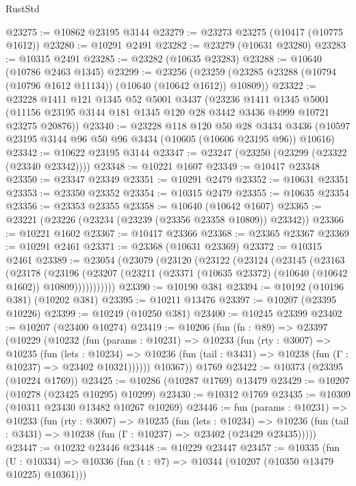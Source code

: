 \begin{lexlean}{RustStd}
\begin{coremodule}
@23275 := @10862 @23195 @3144
@23279 := @23273 @23275 (@10417 (@10775 @1612))
@23280 := @10291 @2491
@23282 := @23279 (@10631 @23280)
@23283 := @10315 @2491
@23285 := @23282 (@10635 @23283)
@23288 := @10640 (@10786 @2463 @1345)
@23299 := @23256
    (@23259 (@23285 @23288 (@10794 (@10796 @1612 @11134)) (@10640 (@10642 @1612)) @10809))
@23322 := @23228
    @1411
    @121
    @1345
    @52
    @5001
    @3437
    (@23236
      @1411
      @1345
      @5001
      (@11156 @23195 @3144 @181 @1345 @120 @28 @3442 @3436 @4999 @10721 @23275 @20876))
@23340 := @23228
    @118
    @120
    @50
    @28
    @3434
    @3436
    (@10597 @23195 @3144 @96 @50 @96 @3434 (@10605 (@10606 @23195 @96)) @10616)
@23342 := @10622 @23195 @3144
@23347 := @23247 (@23250 (@23299 (@23322 (@23340 @23342))))
@23348 := @10221 @1607
@23349 := @10417 @23348
@23350 := @23347 @23349
@23351 := @10291 @2479
@23352 := @10631 @23351
@23353 := @23350 @23352
@23354 := @10315 @2479
@23355 := @10635 @23354
@23356 := @23353 @23355
@23358 := @10640 (@10642 @1607)
@23365 := @23221 (@23226 (@23234 (@23239 (@23356 @23358 @10809)) @23342))
@23366 := @10221 @1602
@23367 := @10417 @23366
@23368 := @23365 @23367
@23369 := @10291 @2461
@23371 := @23368 (@10631 @23369)
@23372 := @10315 @2461
@23389 := @23054
    (@23079
      (@23120
        (@23122
          (@23124
            (@23145
              (@23163
                (@23178
                  (@23196
                    (@23207
                      (@23211 (@23371 (@10635 @23372) (@10640 (@10642 @1602)) @10809)))))))))))
@23390 := @10190 @381
@23394 := @10192 (@10196 @381) (@10202 @381)
@23395 := @10211 @13476
@23397 := @10207 (@23395 @10226)
@23399 := @10249 (@10250 @381)
@23400 := @10245 @23399
@23402 := @10207 (@23400 @10274)
@23419 := @10206
    (fun (fn : @89) =>
    @23397
      (@10229
        (@10232
          (fun (params : @10231) =>
          @10233
            (fun (rty : @3007) =>
            @10235
              (fun (lets : @10234) =>
              @10236 (fun (tail : @3431) => @10238 (fun (Γ : @10237) => @23402 @10321))))))
        @10367))
    @1769
@23422 := @10373 (@23395 (@10224 @1769))
@23425 := @10286 (@10287 @1769) @13479
@23429 := @10207 (@10278 (@23425 @10295) @10299)
@23430 := @10312 @1769
@23435 := @10309 (@10311 @23430 @13482 @10267 @10269)
@23446 := fun (params : @10231) =>
  @10233
    (fun (rty : @3007) =>
    @10235
      (fun (lets : @10234) =>
      @10236 (fun (tail : @3431) => @10238 (fun (Γ : @10237) => @23402 (@23429 @23435)))))
@23447 := @10232 @23446
@23448 := @10229 @23447
@23457 := @10335
    (fun (U : @10334) => @10336 (fun (t : @7) => @10344 (@10207 (@10350 @13479 @10225) @10361)))

\end{coremodule}
\end{lexlean}
